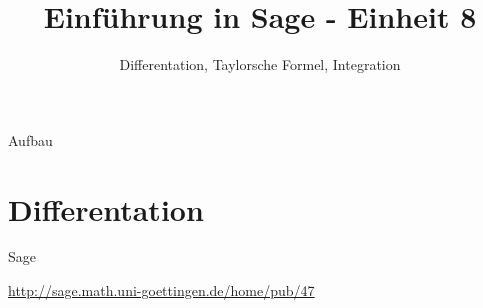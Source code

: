 \documentclass[hyperref={xetex}]{beamer}
\title{Einführung in Sage - Einheit 8}
\subtitle{Differentation, Taylorsche Formel, Integration}
\begin{document}
\titlepage

\begin{frame}{Aufbau}
\tableofcontents
\end{frame}

\section{Differentation}



\begin{frame}[fragile]{Sage}
 \begin{center}
     \url{http://sage.math.uni-goettingen.de/home/pub/47}
 \end{center}
\end{frame}




\end{document}
